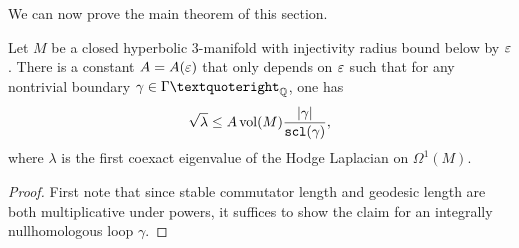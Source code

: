 We can now prove the main theorem of this section.

\begin{mainthm}\label{thm:A} Let $M$ be a closed hyperbolic 3-manifold  with injectivity radius bound below by $\varepsilon$.  There is a constant $A = A(\varepsilon)$ that only depends on $\varepsilon$ such that for any nontrivial boundary $\gamma \in \Gamma’_{\Q}$, one has
$$\sqrt{\lambda} \leq A \operatorname{vol}(M)\frac{|\gamma|}{\operatorname{{\tt{scl}}}(\gamma)},$$
 where $\lambda$ is the first coexact eigenvalue of the Hodge Laplacian on $\Omega^1(M)$.
\end{mainthm}


\begin{proof}
First note that since stable commutator length and geodesic length are both multiplicative under powers, it suffices to show the claim for an integrally nullhomologous loop $\gamma$.


\end{proof}
